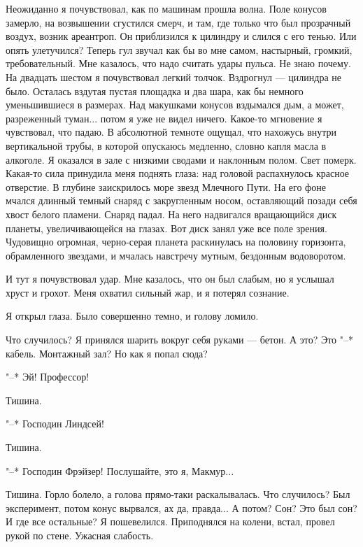 Неожиданно я почувствовал, как по машинам прошла  волна.  Поле  конусов
замерло, на  возвышении  сгустился  смерч,  и  там,  где  только  что  был
прозрачный воздух, возник ареантроп. Он приблизился к цилиндру и слился  с
его тенью. Или опять улетучился? Теперь гул звучал как бы  во  мне  самом,
настырный, громкий, требовательный. Мне казалось, что надо  считать  удары
пульса. Не знаю почему. На двадцать шестом я почувствовал  легкий  толчок.
Вздрогнул --- цилиндра не было. Осталась вздутая пустая площадка и два шара,
как бы немного уменьшившиеся в размерах. Над макушками  конусов  вздымался
дым, а может, разреженный туман... потом я уже не видел  ничего.  Какое-то
мгновение я чувствовал,  что  падаю.  В  абсолютной  темноте  ощущал,  что
нахожусь внутри вертикальной трубы, в которой опускаюсь  медленно,  словно
капля масла в алкоголе. Я оказался в зале с низкими  сводами  и  наклонным
полом. Свет померк.  Какая-то  сила  принудила  меня  поднять  глаза:  над
головой распахнулось красное отверстие. В глубине заискрилось  море  звезд
Млечного Пути. На его фоне мчался длинный  темный  снаряд  с  закругленным
носом, оставляющий позади себя хвост белого пламени. Снаряд падал. На него
надвигался вращающийся диск планеты, увеличивающейся на глазах.  Вот  диск
занял  уже  все  поле  зрения.  Чудовищно  огромная,  черно-серая  планета
раскинулась  на  половину  горизонта,  обрамленного  звездами,  и  мчалась
навстречу мутным, бездонным водоворотом.

И тут я почувствовал удар. Мне  казалось,  что  он  был  слабым,  но  я
услышал хруст и грохот. Меня охватил сильный жар, и я потерял сознание.

\bigskip{}



Я открыл глаза. Было совершенно темно, и голову ломило.

Что случилось? Я принялся шарить вокруг себя руками --- бетон. А это? Это
"--* кабель. Монтажный зал? Но как я попал сюда?

"--* Эй! Профессор!

Тишина.

"--* Господин Линдсей!

Тишина.

"--* Господин Фрэйзер! Послушайте, это я, Макмур...

Тишина. Горло болело, а голова прямо-таки раскалывалась. Что случилось?
Был эксперимент, потом конус вырвался, ах да, правда... А потом? Сон?  Это
был сон? И где все остальные? Я пошевелился. Приподнялся на колени, встал,
провел рукой по стене. Ужасная слабость.

